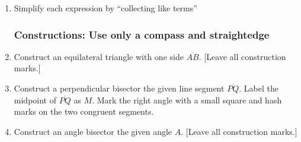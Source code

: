\documentclass[12pt, twoside]{article}
\begin{document}
\begin{enumerate}[itemsep=0.5cm]
\item Simplify each expression by ``collecting like terms''
\begin{enumerate}[itemsep=2cm]
    \end{enumerate}

\newpage
\subsubsection*{Constructions: Use only a compass and straightedge}

\item Construct an equilateral triangle with one side $\overline{AB}$.  [Leave all construction marks.]
\vspace{5cm}
\begin{center}
\end{center} \vspace{2cm}

\item Construct a perpendicular bisector the given line segment $\overline{PQ}$. Label the midpoint of $\overline{PQ}$ as $M$. Mark the right angle with a small square and hash marks on the two congruent segments.
    \vspace{3cm}
    \begin{center}
    \end{center}
    \vspace{2cm}

\newpage
  \item Construct an angle bisector the given angle $A$.  [Leave all construction marks.]
      \vspace{4cm}
      \begin{center}
      \end{center}


\end{enumerate}
\end{document}
